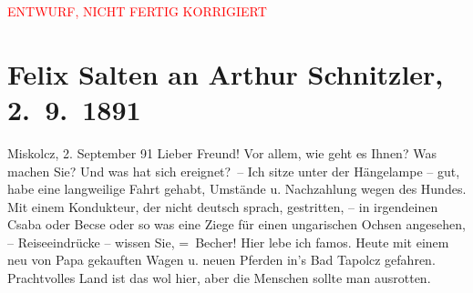 
\begin{center}
            \textcolor{red}{ENTWURF, NICHT FERTIG KORRIGIERT}
                      \end{center}
            
         
         \renewcommand{\erwaehntePersonen}{Personen:  ?? [Partnerin von Paul Goldmann und später Felix Salten], Paula Makay, Philipp Salzmann, Michael Emil Salzmann, Ignaz Salzmann, Theodor Salzmann, Geza Sós}
         \renewcommand{\erwaehnteInstitutionen}{Institutionen: Danzer’s Orpheum}
         \renewcommand{\erwaehnteOrte}{Orte: Miskolc, Miskolctapolca, Mödling, Wien}
         \renewcommand{\erwaehnteWerke}{}
               \section[Felix Salten an Arthur Schnitzler, 2. 9. 1891]{ Felix Salten an Arthur Schnitzler, 2. 9. 1891}\nopagebreak{}\rehead{ }\begin{ledgroupsized}[t]{13cm}\normalsize\beginnumbering \toendnotes[C]{\smallbreak\pagebreak[2]} 
\toendnotes[C]{\smallbreak}\pstart
           {\pb}Miskolcz, 2. September 91\pend
           \pstart
           Lieber Freund! Vor allem, wie geht es Ihnen? Was machen Sie? Und was
               hat sich ereignet? –\pend
           \pstart
           Ich sitze unter der Hängelampe – gut, habe eine langweilige Fahrt gehabt, Umstände u.
               Nachzahlung wegen des Hundes. Mit einem Kondukteur, der nicht deutsch sprach,
               gestritten, – in irgendeinen Csaba oder Becse oder so was eine Ziege für einen
               ungarischen Ochsen angesehen, – Reiseeindrücke – wissen Sie, = Becher!\pend
           \pstart
           {\pb}Hier lebe ich famos. Heute mit
               einem neu von Papa
               gekauften Wagen u. neuen Pferden in’s Bad
                  Tapolcz gefahren. Prachtvolles Land ist das wol hier, aber die Menschen
               sollte man ausrotten. \pend

\end{ledgroupsized}
